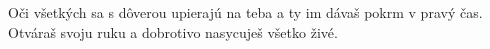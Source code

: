Oči všetkých sa s dôverou upierajú na teba
a ty im dávaš pokrm v pravý čas.
\versseparator
Otváraš svoju ruku
a dobrotivo nasycuješ všetko živé.